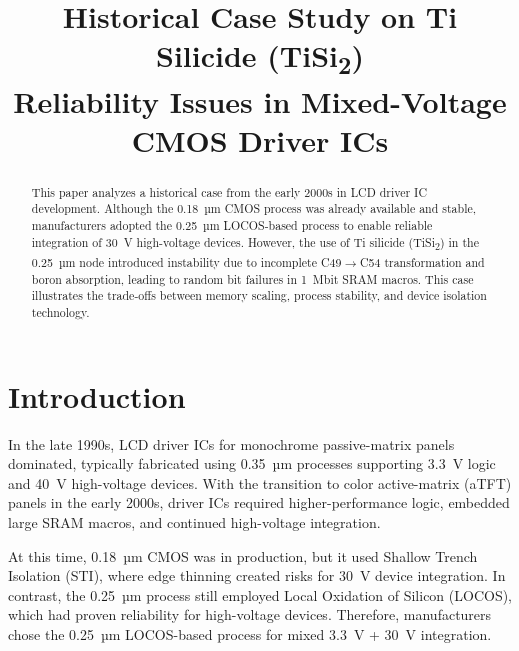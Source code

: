 \documentclass[conference]{IEEEtran}
\begin{document}
\title{Historical Case Study on Ti Silicide (TiSi\textsubscript{2}) \\
Reliability Issues in Mixed-Voltage CMOS Driver ICs}

\author{
}

\maketitle

\begin{abstract}
This paper analyzes a historical case from the early 2000s in LCD driver IC development.  
Although the 0.18~µm CMOS process was already available and stable, manufacturers adopted the 0.25~µm LOCOS-based process to enable reliable integration of 30~V high-voltage devices.  
However, the use of Ti silicide (TiSi\textsubscript{2}) in the 0.25~µm node introduced instability due to incomplete C49$\rightarrow$C54 transformation and boron absorption, leading to random bit failures in 1~Mbit SRAM macros.  
This case illustrates the trade-offs between memory scaling, process stability, and device isolation technology.
\end{abstract}

\section{Introduction}
In the late 1990s, LCD driver ICs for monochrome passive-matrix panels dominated, typically fabricated using 0.35~µm processes supporting 3.3~V logic and 40~V high-voltage devices.  
With the transition to color active-matrix (aTFT) panels in the early 2000s, driver ICs required higher-performance logic, embedded large SRAM macros, and continued high-voltage integration.  

At this time, 0.18~µm CMOS was in production, but it used Shallow Trench Isolation (STI), where edge thinning created risks for 30~V device integration.  
In contrast, the 0.25~µm process still employed Local Oxidation of Silicon (LOCOS), which had proven reliability for high-voltage devices.  
Therefore, manufacturers chose the 0.25~µm LOCOS-based process for mixed 3.3~V + 30~V integration.
\end{document}
